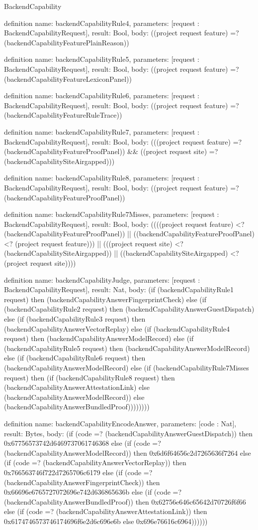 \begin{lexlean}{BackendCapability}
\begin{semanticmodule}
definition{
  name: backendCapabilityRule4,
  parameters: [request : BackendCapabilityRequest],
  result: Bool,
  body: ((project request feature) =? (backendCapabilityFeaturePlainReason))
}

definition{
  name: backendCapabilityRule5,
  parameters: [request : BackendCapabilityRequest],
  result: Bool,
  body: ((project request feature) =? (backendCapabilityFeatureLexiconPanel))
}

definition{
  name: backendCapabilityRule6,
  parameters: [request : BackendCapabilityRequest],
  result: Bool,
  body: ((project request feature) =? (backendCapabilityFeatureRuleTrace))
}

definition{
  name: backendCapabilityRule7,
  parameters: [request : BackendCapabilityRequest],
  result: Bool,
  body: (((project request feature) =? (backendCapabilityFeatureProofPanel)) && ((project request site) =? (backendCapabilitySiteAirgapped)))
}

definition{
  name: backendCapabilityRule8,
  parameters: [request : BackendCapabilityRequest],
  result: Bool,
  body: ((project request feature) =? (backendCapabilityFeatureProofPanel))
}

definition{
  name: backendCapabilityRule7Misses,
  parameters: [request : BackendCapabilityRequest],
  result: Bool,
  body: ((((project request feature) <? (backendCapabilityFeatureProofPanel)) || ((backendCapabilityFeatureProofPanel) <? (project request feature))) || (((project request site) <? (backendCapabilitySiteAirgapped)) || ((backendCapabilitySiteAirgapped) <? (project request site))))
}

definition{
  name: backendCapabilityJudge,
  parameters: [request : BackendCapabilityRequest],
  result: Nat,
  body: (if (backendCapabilityRule1 request) then (backendCapabilityAnswerFingerprintCheck) else (if (backendCapabilityRule2 request) then (backendCapabilityAnswerGuestDispatch) else (if (backendCapabilityRule3 request) then (backendCapabilityAnswerVectorReplay) else (if (backendCapabilityRule4 request) then (backendCapabilityAnswerModelRecord) else (if (backendCapabilityRule5 request) then (backendCapabilityAnswerModelRecord) else (if (backendCapabilityRule6 request) then (backendCapabilityAnswerModelRecord) else (if (backendCapabilityRule7Misses request) then (if (backendCapabilityRule8 request) then (backendCapabilityAnswerAttestationLink) else (backendCapabilityAnswerModelRecord)) else (backendCapabilityAnswerBundledProof))))))))
}

definition{
  name: backendCapabilityEncodeAnswer,
  parameters: [code : Nat],
  result: Bytes,
  body: (if (code =? (backendCapabilityAnswerGuestDispatch)) then 0x67756573742d6469737061746368 else (if (code =? (backendCapabilityAnswerModelRecord)) then 0x6d6f64656c2d7265636f7264 else (if (code =? (backendCapabilityAnswerVectorReplay)) then 0x766563746f722d7265706c6179 else (if (code =? (backendCapabilityAnswerFingerprintCheck)) then 0x66696e6765727072696e742d636865636b else (if (code =? (backendCapabilityAnswerBundledProof)) then 0x62756e646c65642d70726f6f66 else (if (code =? (backendCapabilityAnswerAttestationLink)) then 0x6174746573746174696f6e2d6c696e6b else 0x696e76616c6964))))))
}


\end{semanticmodule}
\end{lexlean}
